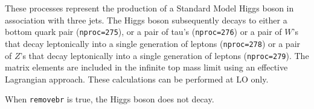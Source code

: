 
These processes represent the production of a Standard Model Higgs boson
in association with three jets. The Higgs boson
subsequently decays to either a bottom quark pair ({\tt nproc=275}),
or a pair of tau's ({\tt nproc=276})
or a pair of $W$'s that decay leptonically into a single generation of leptons ({\tt nproc=278})
or a pair of $Z$'s that decay leptonically into a single generation of leptons ({\tt nproc=279}).
The matrix elements are included in the infinite top mass limit
using an effective Lagrangian approach. These calculations can be
performed at LO only.

When {\tt removebr} is true, the Higgs boson does not decay.
